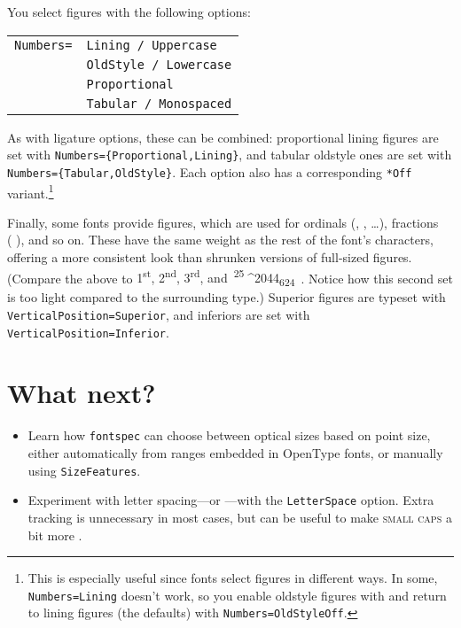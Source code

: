 You select figures with the following options:
\begin{leftfigure}
\begin{tabular}{l l}
\texttt{Numbers=} & \texttt{Lining / Uppercase} \\
 & \texttt{OldStyle / Lowercase} \\
 & \texttt{Proportional} \\
 & \texttt{Tabular / Monospaced}
\end{tabular}
\end{leftfigure}
As with ligature options, these can be combined:
proportional lining figures are set
with \texttt{Numbers=\allowbreak\{Proportional,\allowbreak Lining\}},
and tabular oldstyle ones are set with
\texttt{Numbers=\allowbreak\{Tabular,\allowbreak OldStyle\}}.
Each option also has a corresponding \verb|*Off|
variant.\punckern\footnote{This is especially useful since fonts
select figures in different ways.
In some, \texttt{Numbers=\allowbreak Lining} doesn't work,
so you enable oldstyle figures with 
and return to lining figures (the defaults) with
\texttt{Numbers=\allowbreak OldStyleOff}.}

Finally, some fonts provide  figures,
which are used for ordinals
(,  , \dots),
fractions (\,\,), and so on.
These have the same weight as the rest of the font's characters,
offering a more consistent look than shrunken versions of full-sized figures.
(Compare the above to
{%
\mbox{1\textsuperscript{st}},
\mbox{2\textsuperscript{nd}},
\mbox{3\textsuperscript{rd}},
and
\,\mbox{\textsuperscript{25}^^^^2044\textsubscript{624}}%
\,}.
Notice how this second set is too light compared to the surrounding
type.)
Superior figures are typeset with
\texttt{VerticalPosition=\allowbreak Superior},
and inferiors are set with \texttt{VerticalPosition=\allowbreak Inferior}.

\section{What next?}
\begin{itemize}
\item Learn how \texttt{fontspec} can choose between optical sizes based on
    point size, either automatically from ranges embedded in OpenType fonts,
    or manually using \texttt{SizeFeatures}.
\item Experiment with letter spacing---or ---with
    the \texttt{LetterSpace} option.
    Extra tracking is unnecessary in most cases,
    but can be useful to make \textsc{small caps}
    a bit more .
\end{itemize}

